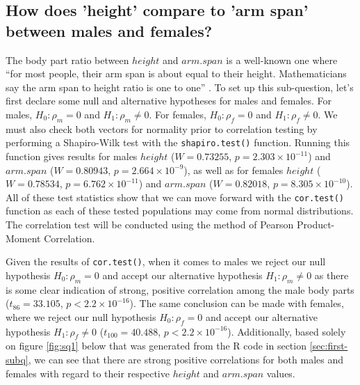 \documentclass[]{article}
\begin{document}
\subsection{How does 'height' compare to 'arm span' between males and females?}
\label{sec:rq2}

The body part ratio between \(height\) and \(arm.span\) is a well-known
one where ``for most people, their arm span is about equal to their
height. Mathematicians say the arm span to height ratio is one to one''
\citep{Brabandere:2017}. To set up this sub-question, let's first
declare some null and alternative hypotheses for males and females. For
males, \(H_0:\rho_m=0\) and \(H_1:\rho_m\neq0\). For females,
\(H_0:\rho_f=0\) and \(H_1:\rho_f\neq0\). We must also check both
vectors for normality prior to correlation testing by performing a
Shapiro-Wilk test with the \texttt{shapiro.test()} function. Running
this function gives results for males \(height\) (\(W=0.73255\),
\(p=2.303\times10^{-11}\)) and \(arm.span\) (\(W=0.80943\),
\(p=2.664\times10^{-9}\)), as well as for females \(height\)
(\(W=0.78534\), \(p=6.762\times10^{-11}\)) and \(arm.span\)
(\(W=0.82018\), \(p=8.305\times10^{-10}\)). All of these test statistics
show that we can move forward with the \texttt{cor.test()} function as
each of these tested populations may come from normal distributions. The
correlation test will be conducted using the method of Pearson
Product-Moment Correlation.

\vspace{0.25cm}

Given the results of \texttt{cor.test()}, when it comes to males we
reject our null hypothesis \(H_0:\rho_m=0\) and accept our alternative
hypothesis \(H_1:\rho_m\neq0\) as there is some clear indication of
strong, positive correlation among the male body parts
(\(t_{86}=33.105\), \(p<2.2\times10^{-16}\)). The same conclusion can be
made with females, where we reject our null hypothesis \(H_0:\rho_f=0\)
and accept our alternative hypothesis \(H_1:\rho_f\neq0\)
(\(t_{100}=40.488\), \(p<2.2\times10^{-16}\)). Additionally, based
solely on figure \ref{fig:sq1} below that was generated from the R code
in section \ref{sec:first-subq}, we can see that there are strong
positive correlations for both males and females with regard to their
respective \(height\) and \(arm.span\) values.
\end{document}
